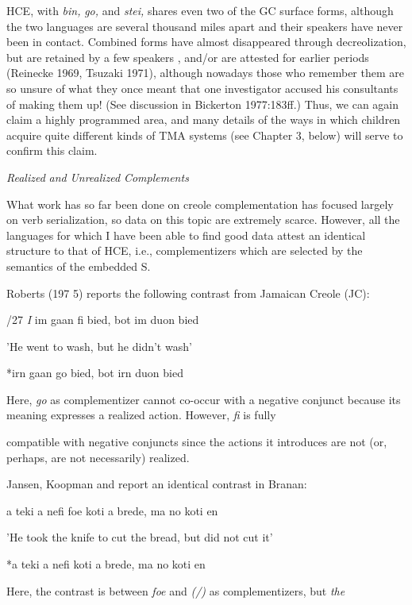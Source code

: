HCE, with \textit{bin,} \textit{go,} and \textit{stei,} shares even two of the GC surface forms, although the two languages are several thousand miles apart and their speakers have never been in contact. Combined forms have almost disappeared through decreolization, but are retained by a few speakers \citep{Bickerton1974}, and/or are attested for earlier periods (Reinecke 1969, Tsuzaki 1971), although nowadays those who remember them are so unsure of what they once meant that one investigator \citep{Perlman1973} accused his consultants of making them up! (See discussion in Bickerton 1977:183ff.) Thus, we can again claim a highly programmed area, and many details of the ways in which children acquire quite different kinds of TMA systems (see Chapter 3, below) will serve to confirm this claim.

\textit{Realized} \textit{and} \textit{Unrealized} \textit{Complements}

What work has so far been done on creole complementation has focused largely on verb serialization, so data on this topic are extremely scarce. However, all the languages for which I have been able to find good data attest an identical structure to that of HCE, i.e., complementizers which are selected by the semantics of the em\-bedded S.

Roberts (197 5) reports the following contrast from Jamaican Creole (JC):

/27 \textit{I }im gaan fi bied, bot im duon bied

'He went to wash, but he didn't wash'

\ea\label{ex:28}
 *irn gaan go bied, bot irn duon bied
\glt
\z

Here, \textit{go }as complementizer cannot co-occur with a negative conjunct because its meaning expresses a realized action. However, \textit{fi} is fully


compatible with negative conjuncts since the actions it introduces are not (or, perhaps, are not necessarily) realized.

Jansen, Koopman and \citet{Muysken1978} report an identical con\-trast in Branan:

\ea\label{ex:29}
 a teki a nefi foe koti a brede, ma no koti en
\glt
\z

'He took the knife to cut the bread, but did not cut it'

\ea\label{ex:30}
 *a teki a nefi koti a brede, ma no koti en
\glt
\z

Here, the contrast is between \textit{foe }and \textit{(/)} as complementizers, but \textit{the}

